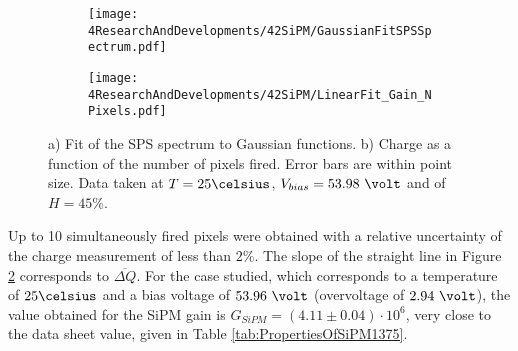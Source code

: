 \begin{figure}
\centering
    \begin{subfigure}[b]{0.9\textwidth}
    \centering
    \texttt{[image: 4ResearchAndDevelopments/42SiPM/GaussianFitSPSSpectrum.pdf]}  
    \caption{\label{subfig:GaussianFitSiPMs}}
    \end{subfigure}
    \hfill
    \begin{subfigure}[b]{0.9\textwidth}
    \centering
    \texttt{[image: 4ResearchAndDevelopments/42SiPM/LinearFit\_Gain\_NPixels.pdf]}  
    \caption{\label{subfig:LinearFitSiPMGain}}
    \end{subfigure}
 \caption{a) Fit of the SPS spectrum to Gaussian functions. b) Charge as a function of the number of pixels fired. Error bars are within point size. Data taken at $T=25\celsius$, $V_{bias}=53.98~\volt$ and of $H=45\%$.}
 \label{fig:ROOTAnalysisSiPMGain}
\end{figure}
Up to 10 simultaneously fired pixels were obtained with a relative uncertainty of the charge measurement of less than $2\%$. The slope of the straight line in Figure \ref{subfig:LinearFitSiPMGain} corresponds to $\overline{\Delta Q}$.
For the case studied, which corresponds to a temperature of $25\celsius$ and a bias voltage of $53.96~\volt$ (overvoltage of $2.94~\volt$), the value obtained for the SiPM gain is $G_{SiPM}=(4.11 \pm 0.04) \cdot{} 10^{6}$, very close to the data sheet value, given in Table \ref{tab:PropertiesOfSiPM1375}.

